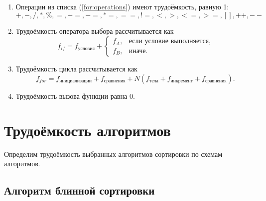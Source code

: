 \begin{enumerate}[label=\arabic*)]
	\item Операции из списка (\ref{for:operations}) имеют трудоёмкость, равную 1:
	\begin{equation}
		\label{for:operations}
		+, -, /, *, \%, =, +=, -=, *=, ==, !=, <, >, <=, >=, [], ++, {-}-
	\end{equation}
	\item Трудоёмкость оператора выбора  рассчитывается как
	\begin{equation}
		\label{for:if}
		f_{if} = f_{\text{условия}} +
		\begin{cases}
			f_A, & \text{если условие выполняется,}\\
			f_B, & \text{иначе.}
		\end{cases}
	\end{equation}
	\item Трудоёмкость цикла рассчитывается как
	\begin{equation}
		\label{for:cycle}
		f_{for} = f_{\text{инициализации}} + f_{\text{сравнения}} + N(f_{\text{тела}} + f_{\text{инкремент}} + f_{\text{сравнения}}).
	\end{equation}
	\item Трудоёмкость вызова функции равна 0.
\end{enumerate}


\section{Трудоёмкость алгоритмов}

Определим трудоёмкость выбранных алгоритмов сортировки по схемам алгоритмов.

\subsection{Алгоритм блинной сортировки}

